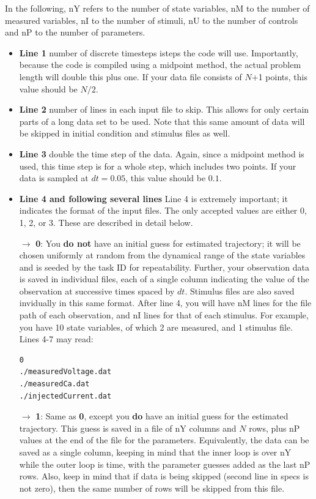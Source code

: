 \documentclass[11pt]{article}
\begin{document}
{  In the following, nY refers to the number of state variables, nM to the number of measured variables, nI to the number of stimuli, nU to the number of controls and nP to the number of parameters.

\begin{itemize}

\item {\bf Line 1} number of discrete timesteps isteps the code will use.  Importantly, because the code is compiled using a midpoint method, the actual problem length will double this plus one. If your data file consists of $N$+1 points, this value should be $N/2$.
\item {\bf Line 2} number of lines in each input file to skip.  This allows for only certain parts of a long data set to be used. Note that this same amount of data will be skipped in initial condition and stimulus files as well.
\item {\bf Line 3} double the time step of the data. Again, since a midpoint method is used, this time step is for a whole step, which includes two points. If your data is sampled at $dt = 0.05$, this value should be $0.1$.
\item {\bf Line 4 and following several lines} Line 4 is extremely important; it indicates the format of the input files. The only accepted values are  either 0, 1, 2, or 3. These are described in detail below.


\item[$\rightarrow$] {\bf 0}: You {\bf do not} have an initial guess for estimated trajectory; it will be chosen uniformly at random from the dynamical range of the state variables and is seeded by the task ID for repeatability. Further, your observation data is saved in individual files, each of a single column indicating the value of the observation at successive times spaced by $dt$. Stimulus files are also saved invidually in this same format. After line 4, you will have nM lines for the file path of each observation, and nI lines for that of each stimulus. For example, you have 10 state variables, of which 2 are measured, and 1 stimulus file. Lines 4-7 may read:

\begin{verbatim}
0
./measuredVoltage.dat
./measuredCa.dat
./injectedCurrent.dat
\end{verbatim}

\item[$\rightarrow$] {\bf 1}: Same as {\bf 0}, except you {\bf do} have an initial guess for the estimated trajectory. This guess is saved in a file of nY columns and $N$ rows, plus nP values at the end of the file for the parameters. Equivalently, the data can be saved as a single column, keeping in mind that the inner loop is over nY while the outer loop is time, with the parameter guesses added as the last nP rows. Also, keep in mind that if data is being skipped (second line in specs is not zero), then the same number of rows will be skipped from this file. 


\end{itemize}}
\end{document}
